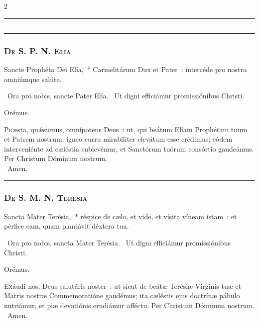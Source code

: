 \documentclass[9pt,twoside]{extarticle}
\begin{document}
\begin{multicols}{2}
\begin{center}\textcolor{red}{\rule{\linewidth}{0.5pt}} \end{center}

\subsection*{\center \textsc{}}
\subsubsection*{\center {}}

\begin{center}\textcolor{red}{\rule{\linewidth}{0.5pt}} \end{center}

\subsubsection*{\center \textsc{De S. P. N. Elia}}
\begin{tightlist}{}
\item {} Sancte Prophéta Dei Elía,~* Carmelitárum Dux et Pater~: intercéde pro nostra omniúmque salúte.
\item {}~Ora pro nobis, sancte Pater Elía. ~Ut digni efficiámur promissiónibus Christi.
\item Orémus. \hfill {}
\end{tightlist}
\lettrine{P}ræsta, quǽsumus, omnípotens Deus~: ut, qui beátum Elíam Prophétam tuum et Patrem nostrum, ígneo curru mirabíliter elevátum esse crédimus; eódem interveniénte ad cæléstia sublevémur, et Sanctórum tuórum consórtio gaudeámus. Per Christum Dóminum nostrum.\\ 
~Amen.

\begin{center}\textcolor{red}{\rule{\linewidth}{0.5pt}} \end{center}

\subsubsection*{\center \textsc{De S. M. N. Teresia}}
\begin{tightlist}{}
\item {} Sancta Mater Terésia,~* réspice de cælo, et vide, et vísita víneam istam~: et pérfice eam, quam plantávit déxtera tua.
\item {}~Ora pro nobis, sancta Mater Terésia. ~Ut digni efficiámur promissiónibus Christi.
\item Orémus. \hfill {}
\end{tightlist}
\lettrine{E}xáudi nos, Deus salutáris noster~: ut sicut de beátæ Terésiæ Vírginis tuæ et Matris nostræ Commemoratióne gaudémus; ita cæléstis ejus doctrínæ pábulo nutriámur, et piæ devotiónis erudiámur afféctu. Per Christum Dóminum nostrum. ~Amen.


\end{multicols}
\end{document}

